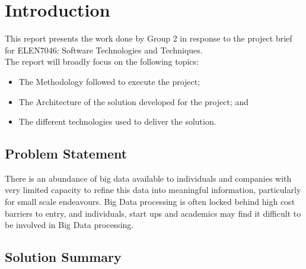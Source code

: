 \documentclass[12pt]{article} %
\begin{document}
		
	
		
		\newpage
	
	
	\tableofcontents %
	
	\newpage %
	
	
	\section{Introduction} %
	
This report presents the work done by Group 2 in response to the project brief for ELEN7046: Software Technologies and Techniques.\\

The report will broadly focus on the following topics:

\begin{itemize}
	\item The Methodology followed to execute the project;
	\item The Architecture of the solution developed for the project; and
	\item The different technologies used to deliver the solution.
\end{itemize}

\subsection{Problem Statement}

There is an abundance of big data available to individuals and companies with very limited capacity to refine this data into meaningful information, particularly for small scale endeavours. Big Data processing is often locked behind high cost barriers to entry, and individuals, start ups and academics may find it difficult to be involved in Big Data processing.

\subsection{Solution Summary}
\end{document}
